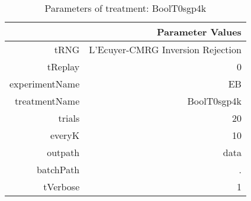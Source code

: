 \begin{table}[ht]
\centering
\begin{tabular}{rr}
  \hline
 & Parameter Values \\ 
  \hline
tRNG & L'Ecuyer-CMRG Inversion Rejection \\ 
  tReplay & 0 \\ 
  experimentName & EB \\ 
  treatmentName & BoolT0sgp4k \\ 
  trials & 20 \\ 
  everyK & 10 \\ 
  outpath & data \\ 
  batchPath & . \\ 
  tVerbose & 1 \\ 
   \hline
\end{tabular}
\caption{ Parameters of treatment: BoolT0sgp4k 
} 
\end{table}
